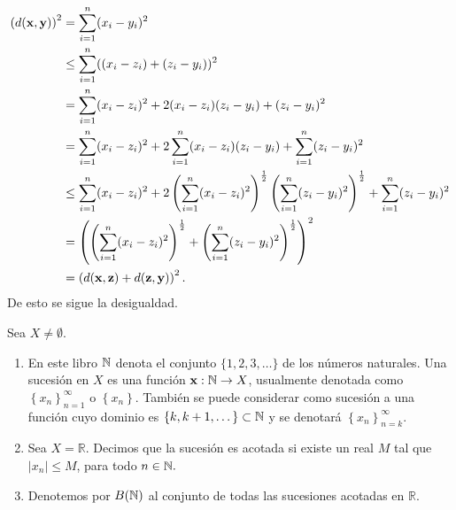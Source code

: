 \begin{align*}
    \left(d(\mathbf{x}, \mathbf{y})\right)^2& =\sum_{i=1}^n(x_i-y_i)^2 \\
    & \leq \sum_{i=1}^n((x_i-z_i)+(z_i-y_i))^2\\
    & =\sum_{i=1}^n(x_i-z_i)^2+2(x_i-z_i)(z_i-y_i)+(z_i-y_i)^2 \\
    & = \sum_{i=1}^n(x_i-z_i)^2 +2\sum_{i=1}^n(x_i-z_i)(z_i-y_i)+\sum_{i=1}^n(z_i-y_i)^2 \\
    & \leq \sum_{i=1}^n(x_i-z_i)^2 +2\left(\sum_{i=1}^n(x_i-z_i)^2\right)^\frac{1}{2}\left(\sum_{i=1}^n(z_i-y_i)^2\right)^\frac{1}{2}+\sum_{i=1}^n(z_i-y_i)^2 \\
    & =  \left(\left(\sum_{i=1}^n(x_i-z_i)^2\right)^\frac{1}{2}+\left(\sum_{i=1}^n(z_i-y_i)^2\right)^\frac{1}{2}\right)^2\\
    & =\left(d(\mathbf{x}, \mathbf{z})+d(\mathbf{z}, \mathbf{y})\right)^2.
\end{align*}
De esto se sigue la desigualdad.
\begin{definicion}Sea $X\neq \emptyset$. \begin{enumerate}
    \item En este libro $\mathbb{N}$ denota el conjunto $\{1,2,3,\dots\}$ de los números naturales. Una sucesión en $X$ es una función $\mathbf{x}:\mathbb{N} \to X$, usualmente denotada como $\left\{ x_n \right\}_{n=1}^\infty $ o  $\left\{ x_n \right\} .$ También se puede considerar como sucesión a una función cuyo dominio es $\left\{ k, k+1, \dots\right\} \subset \mathbb{N}$  y se denotará  $\left\{ x_n \right\}_{n=k}^\infty $.
    \item Sea $X=\mathbb{R}$. Decimos que la sucesión es acotada si existe un real $M$ tal que $|x_n|\leq M$, para todo $n \in \mathbb{N}.$
    \item Denotemos por $B(\mathbb{N})$ al conjunto de todas las sucesiones acotadas en $\mathbb{R}$.
\end{enumerate}
\end{definicion}


